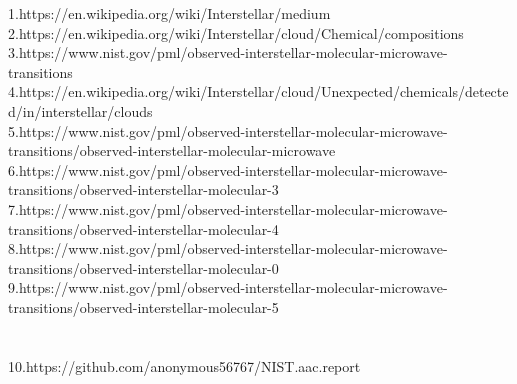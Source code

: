 \documentclass{article}
\begin{document}
1.https://en.wikipedia.org/wiki/Interstellar/medium \\
2.https://en.wikipedia.org/wiki/Interstellar/cloud/Chemical/compositions\\
3.https://www.nist.gov/pml/observed-interstellar-molecular-microwave-transitions\\
4.https://en.wikipedia.org/wiki/Interstellar/cloud/Unexpected/chemicals/detected/in/interstellar/clouds    \\  
5.https://www.nist.gov/pml/observed-interstellar-molecular-microwave-transitions/observed-interstellar-molecular-microwave\\
6.https://www.nist.gov/pml/observed-interstellar-molecular-microwave-transitions/observed-interstellar-molecular-3\\
7.https://www.nist.gov/pml/observed-interstellar-molecular-microwave-transitions/observed-interstellar-molecular-4\\
8.https://www.nist.gov/pml/observed-interstellar-molecular-microwave-transitions/observed-interstellar-molecular-0\\
9.https://www.nist.gov/pml/observed-interstellar-molecular-microwave-transitions/observed-interstellar-molecular-5\\ \\ \\
10.https://github.com/anonymous56767/NIST.aac.report
\end{document}
